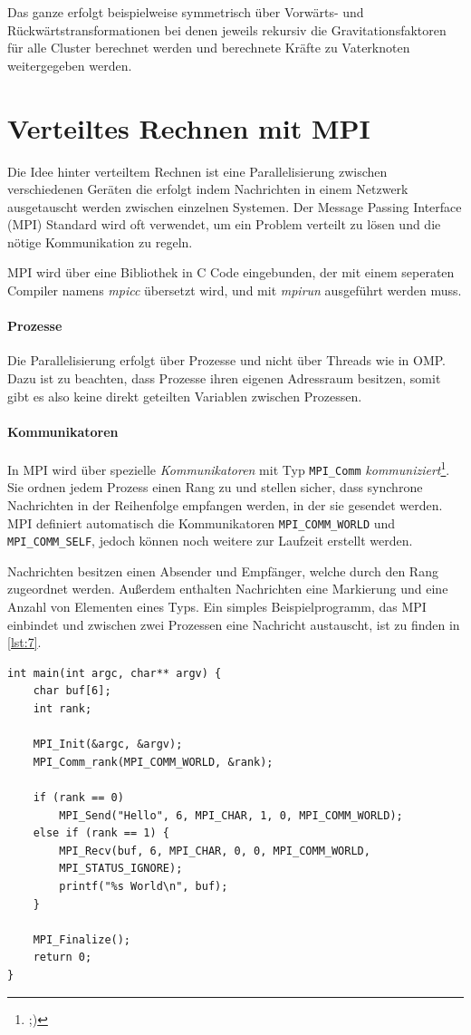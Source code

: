 Das ganze erfolgt beispielweise symmetrisch über Vorwärts- und Rückwärtstransformationen bei denen jeweils rekursiv die Gravitationsfaktoren für alle Cluster berechnet werden und berechnete Kräfte zu Vaterknoten weitergegeben werden.

\section{Verteiltes Rechnen mit MPI}
Die Idee hinter verteiltem Rechnen ist eine Parallelisierung zwischen verschiedenen Geräten die erfolgt indem Nachrichten in einem Netzwerk ausgetauscht werden zwischen einzelnen Systemen.
Der Message Passing Interface (MPI) Standard wird oft verwendet, um ein Problem verteilt zu lösen und die nötige Kommunikation zu regeln.

MPI wird über eine Bibliothek in C Code eingebunden, der mit einem seperaten Compiler namens \emph{mpicc} übersetzt wird, und mit \emph{mpirun} ausgeführt werden muss.

\paragraph{Prozesse}
Die Parallelisierung erfolgt über Prozesse und nicht über Threads wie in OMP.
Dazu ist zu beachten, dass Prozesse ihren eigenen Adressraum besitzen, somit gibt es also keine direkt geteilten Variablen zwischen Prozessen.

\paragraph{Kommunikatoren}
In MPI wird über spezielle \emph{Kommunikatoren} mit Typ \lstinline|MPI_Comm| \emph{kommuniziert}\footnote{;)}.
Sie ordnen jedem Prozess einen Rang zu und stellen sicher, dass synchrone Nachrichten in der Reihenfolge empfangen werden, in der sie gesendet werden.
MPI definiert automatisch die Kommunikatoren \lstinline|MPI_COMM_WORLD| und \lstinline|MPI_COMM_SELF|, jedoch können noch weitere zur Laufzeit erstellt werden.

Nachrichten besitzen einen Absender und Empfänger, welche durch den Rang zugeordnet werden.
Außerdem enthalten Nachrichten eine Markierung und eine Anzahl von Elementen eines Typs.
Ein simples Beispielprogramm, das MPI einbindet und zwischen zwei Prozessen eine Nachricht austauscht, ist zu finden in \autoref{lst:7}.

\begin{lstlisting}[label={lst:7}, caption={Ein einfaches MPI Programm}]
int main(int argc, char** argv) {
    char buf[6];
    int rank;

    MPI_Init(&argc, &argv);
    MPI_Comm_rank(MPI_COMM_WORLD, &rank);

    if (rank == 0)
        MPI_Send("Hello", 6, MPI_CHAR, 1, 0, MPI_COMM_WORLD);
    else if (rank == 1) {
        MPI_Recv(buf, 6, MPI_CHAR, 0, 0, MPI_COMM_WORLD,
        MPI_STATUS_IGNORE);
        printf("%s World\n", buf);
    }

    MPI_Finalize();
    return 0;
}
\end{lstlisting}


